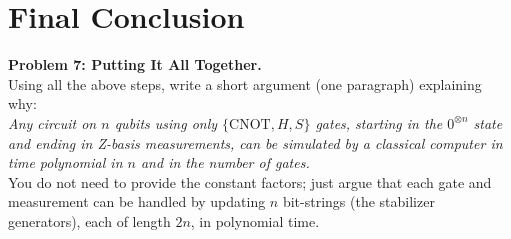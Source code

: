 \documentclass{article}
\begin{document}
\section*{Final Conclusion}
\begin{question}
    \textbf{Problem 7: Putting It All Together.}\\
    Using all the above steps, write a short argument (one paragraph) explaining why:\\
    
    \textit{Any circuit on \(n\) qubits using only \(\{\text{CNOT}, H, S\}\) gates, starting in the \(0^{\otimes n}\) state and ending in Z-basis measurements, can be simulated by a classical computer in time polynomial in \(n\) and in the number of gates.}\\
    
    You do not need to provide the constant factors; just argue that each gate and measurement can be handled by updating \(n\) bit-strings (the stabilizer generators), each of length \(2n\), in polynomial time.
\end{question}
\end{document}
